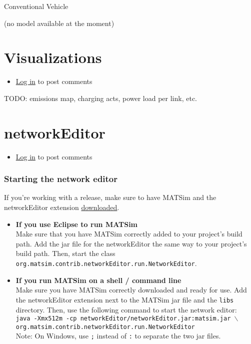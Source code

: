 \documentclass[a4paper,11pt]{report}
\begin{document}
Conventional Vehicle

(no model available at the moment)



\vfill\eject
\section{Visualizations}
\begin{itemize}
	\item \href{http://www.matsim.org/user/login?destination=comment/reply/721%23comment-form}{Log in} to post comments
\end{itemize}

TODO: emissions map, charging acts, power load per link, etc.

\vfill\eject
\section{networkEditor}
\begin{itemize}
	\item \href{http://www.matsim.org/user/login?destination=comment/reply/676%23comment-form}{Log in} to post comments
\end{itemize}

\subsubsection{Starting the network editor}

If you're working with a release, make sure to have MATSim and the networkEditor extension \href{http://www.matsim.org/downloads}{downloaded}.
\begin{itemize}
	\item \textbf{If you use Eclipse to run MATSim}
\\     Make  sure that you have MATSim correctly added to your project's build path.  Add the jar file for the networkEditor the same way to your project's  build path. Then, start the class 
\texttt{org.matsim.contrib.networkEditor.run.NetworkEditor}.
	\item \textbf{If you run MATSim on a shell / command line}
\\      Make sure you have MATSim correctly downloaded and ready for use. Add  the networkEditor extension next to the MATSim jar file and the 
\texttt{libs} directory. Then, use the following command to start the network editor:
\\
\texttt{java -Xmx512m -cp networkEditor/networkEditor.jar:matsim.jar $\backslash$
\\      org.matsim.contrib.networkEditor.run.NetworkEditor}
\\Note: On Windows, use 
\texttt{;} instead of 
\texttt{:} to separate the two jar files.
\end{itemize}
\end{document}
